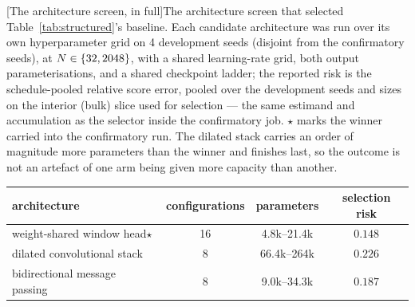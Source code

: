 
\begin{center}
\begin{minipage}{\linewidth}\small\centering
{}[The architecture screen, in full]{The architecture screen that selected Table~\ref{tab:structured}'s
baseline. Each candidate architecture was run over its own hyperparameter grid on
4 development seeds (disjoint from the confirmatory seeds),
at $N \in \{32, 2048\}$, with a shared learning-rate grid,
both output parameterisations, and a shared checkpoint ladder; the reported risk is
the schedule-pooled relative score error, pooled over the development seeds and
sizes on the interior (bulk) slice used for selection --- the same estimand and
accumulation as the selector inside the confirmatory job. $\star$
marks the winner carried into the confirmatory run. The dilated stack carries an
order of magnitude more parameters than the winner and finishes last, so the
outcome is not an artefact of one arm being given more capacity than another.}
\label{tab:screening}
\begin{tabular}{lccc}
\toprule
architecture & configurations & parameters & selection risk \\
\midrule
weight-shared window head\;$\star$ & 16 & 4.8k--21.4k & $0.148$ \\
dilated convolutional stack & 8 & 66.4k--264k & $0.226$ \\
bidirectional message passing & 8 & 9.0k--34.3k & $0.187$ \\
\bottomrule
\end{tabular}
\end{minipage}
\end{center}
